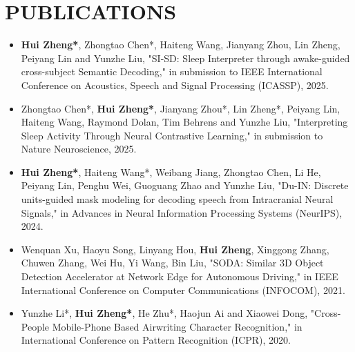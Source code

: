 \documentclass{resume}
\begin{document}
\section{{\bfseries PUBLICATIONS}}
\begin{itemize}[parsep=0.2ex]
  \item \textbf{Hui Zheng*}, Zhongtao Chen*, Haiteng Wang, Jianyang Zhou, Lin Zheng, Peiyang Lin and Yunzhe Liu, "SI-SD: Sleep Interpreter through awake-guided cross-subject Semantic Decoding," in submission to IEEE International Conference on Acoustics, Speech and Signal Processing (ICASSP), 2025.
  \item Zhongtao Chen*, \textbf{Hui Zheng*}, Jianyang Zhou*, Lin Zheng*, Peiyang Lin, Haiteng Wang, Raymond Dolan, Tim Behrens and Yunzhe Liu, "Interpreting Sleep Activity Through Neural Contrastive Learning," in submission to Nature Neuroscience, 2025.
  \item \textbf{Hui Zheng*}, Haiteng Wang*, Weibang Jiang, Zhongtao Chen, Li He, Peiyang Lin, Penghu Wei, Guoguang Zhao and Yunzhe Liu, "Du-IN: Discrete units-guided mask modeling for decoding speech from Intracranial Neural Signals," in Advances in Neural Information Processing Systems (NeurIPS), 2024.
  \item Wenquan Xu, Haoyu Song, Linyang Hou, \textbf{Hui Zheng}, Xinggong Zhang, Chuwen Zhang, Wei Hu, Yi Wang, Bin Liu, "SODA: Similar 3D Object Detection Accelerator at Network Edge for Autonomous Driving," in IEEE International Conference on Computer Communications (INFOCOM), 2021.
  \item Yunzhe Li*, \textbf{Hui Zheng*}, He Zhu*, Haojun Ai and Xiaowei Dong, "Cross-People Mobile-Phone Based Airwriting Character Recognition," in International Conference on Pattern Recognition (ICPR), 2020.
\end{itemize}

\end{document}
